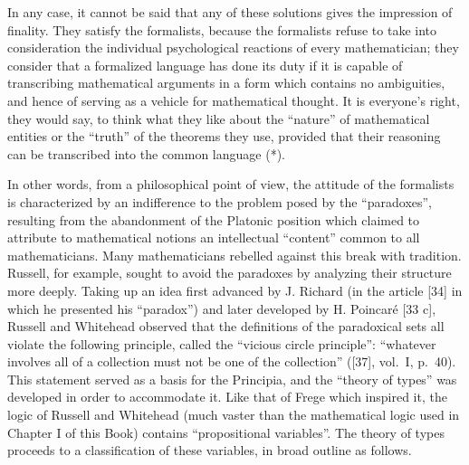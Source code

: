 In any case, it cannot be said that any of these solutions gives the impression of finality. They satisfy the formalists, because the formalists refuse to take into consideration the individual psychological reactions of every mathematician; they consider that a formalized language has done its duty if it is capable of transcribing mathematical arguments in a form which contains no ambiguities, and hence of serving as a vehicle for mathematical thought. It is everyone's right, they would say, to think what they like about the ``nature'' of mathematical entities or the ``truth'' of the theorems they use, provided that their reasoning can be transcribed into the common language (*).

In other words, from a philosophical point of view, the attitude of the formalists is characterized by an indifference to the problem posed by the ``paradoxes'', resulting from the abandonment of the Platonic position which claimed to attribute to mathematical notions an intellectual ``content'' common to all mathematicians. Many mathematicians rebelled against this break with tradition. Russell, for example, sought to avoid the paradoxes by analyzing their structure more deeply. Taking up an idea first advanced by J. Richard (in the article {[}34{]} in which he presented his ``paradox'') and later developed by H. Poincaré {[}33 c{]}, Russell and Whitehead observed that the definitions of the paradoxical sets all violate the following principle, called the ``vicious circle principle'': ``whatever involves all of a collection must not be one of the collection'' ({[}37{]}, vol.~I, p.~40). This statement served as a basis for the Principia, and the ``theory of types'' was developed in order to accommodate it. Like that of Frege which inspired it, the logic of Russell and Whitehead (much vaster than the mathematical logic used in Chapter I of this Book) contains ``propositional variables''. The theory of types proceeds to a classification of these variables, in broad outline as follows.

